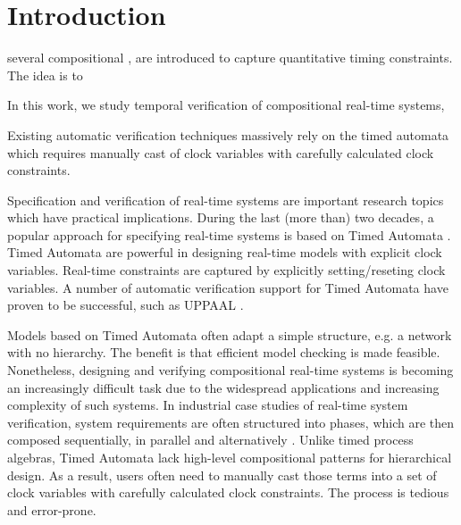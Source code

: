 \documentclass[acmsmall,10pt,review]{acmart}
\begin{document}


  



\maketitle

\section{Introduction}
\label{Introduction}

several compositional ,  
are introduced to capture quantitative timing constraints.
The idea is to 


In this work, we study temporal verification of 
compositional real-time systems,



Existing automatic verification techniques massively rely on 
the timed automata which requires manually cast of clock variables with 
carefully calculated clock constraints. 

Specification and verification of real-time systems are important 
research topics which have practical implications. During the last 
(more than) two decades, a popular approach for specifying real-time systems is 
based on Timed Automata \cite{DBLP:journals/tcs/AlurD94}. 
Timed Automata are powerful 
in designing real-time models with explicit clock variables. Real-time 
constraints are captured by explicitly setting/reseting clock variables. 
A number of automatic verification support for Timed Automata have proven 
to be successful, such as UPPAAL \cite{DBLP:journals/sttt/LarsenPY97}.


Models based on Timed Automata often adapt a simple structure, e.g. a 
network with no hierarchy. The benefit is that 
efficient model checking is made feasible. Nonetheless, designing and 
verifying compositional real-time systems is becoming an increasingly 
difficult task due to the widespread applications and increasing complexity 
of such systems. In industrial case studies of real-time system verification, system 
requirements are often structured into phases, which are then composed 
sequentially, in parallel and alternatively \cite{DBLP:conf/emsoft/LarsenMNS05}. 
Unlike timed process algebras, Timed Automata lack high-level 
compositional patterns for hierarchical design. As a result, users often 
need to manually cast those terms into a set of clock variables with 
carefully calculated clock constraints. The process is tedious and error-prone.
\end{document}
